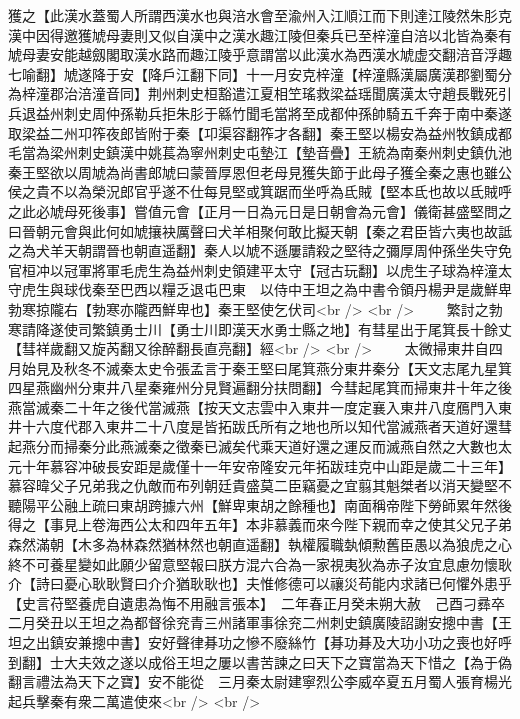獲之【此漢水蓋蜀人所謂西漢水也與涪水會至渝州入江順江而下則達江陵然朱肜克漢中因得邀獲虓母妻則又似自漢中之漢水趣江陵但秦兵已至梓潼自涪以北皆為秦有虓母妻安能越劔閣取漢水路而趣江陵乎意謂當以此漢水為西漢水虓虚交翻涪音浮趣七喻翻】虓遂降于安【降戶江翻下同】十一月安克梓潼【梓潼縣漢屬廣漢郡劉蜀分為梓潼郡治涪潼音同】荆州刺史桓豁遣江夏相笁瑤救梁益瑶聞廣漢太守趙長戰死引兵退益州刺史周仲孫勒兵拒朱肜于緜竹聞毛當將至成都仲孫帥騎五千奔于南中秦遂取梁益二州卭筰夜郎皆附于秦【卭渠容翻筰才各翻】秦王堅以楊安為益州牧鎮成都毛當為梁州刺史鎮漢中姚萇為寧州刺史屯墊江【墊音疊】王統為南秦州刺史鎮仇池秦王堅欲以周虓為尚書郎虓曰蒙晉厚恩但老母見獲失節于此母子獲全秦之惠也雖公侯之貴不以為榮況郎官乎遂不仕每見堅或箕踞而坐呼為氐賊【堅本氐也故以氐賊呼之此必虓母死後事】嘗值元會【正月一日為元日是日朝會為元會】儀衛甚盛堅問之曰晉朝元會與此何如虓攘袂厲聲曰犬羊相聚何敢比擬天朝【秦之君臣皆六夷也故詆之為犬羊天朝謂晉也朝直遥翻】秦人以虓不遜屢請殺之堅待之彌厚周仲孫坐失守免官桓冲以冠軍將軍毛虎生為益州刺史領建平太守【冠古玩翻】以虎生子球為梓潼太守虎生與球伐秦至巴西以糧乏退屯巴東　以侍中王坦之為中書令領丹楊尹是歲鮮卑勃寒掠隴右【勃寒亦隴西鮮卑也】秦王堅使乞伏司<br />
<br />
　　繁討之勃寒請降遂使司繁鎮勇士川【勇士川即漢天水勇士縣之地】有彗星出于尾箕長十餘丈【彗祥歲翻又旋芮翻又徐醉翻長直亮翻】經<br />
<br />
　　太微掃東井自四月始見及秋冬不滅秦太史令張孟言于秦王堅曰尾箕燕分東井秦分【天文志尾九星箕四星燕幽州分東井八星秦雍州分見賢遍翻分扶問翻】今彗起尾箕而掃東井十年之後燕當滅秦二十年之後代當滅燕【按天文志雲中入東井一度定襄入東井八度鴈門入東井十六度代郡入東井二十八度是皆拓跋氏所有之地也所以知代當滅燕者天道好還彗起燕分而掃秦分此燕滅秦之徵秦已滅矣代乘天道好還之運反而滅燕自然之大數也太元十年慕容冲破長安距是歲僅十一年安帝隆安元年拓跋珪克中山距是歲二十三年】慕容暐父子兄弟我之仇敵而布列朝廷貴盛莫二臣竊憂之宜翦其魁桀者以消天變堅不聽陽平公融上疏曰東胡跨據六州【鮮卑東胡之餘種也】南面稱帝陛下勞師累年然後得之【事見上卷海西公太和四年五年】本非慕義而來今陛下親而幸之使其父兄子弟森然滿朝【木多為林森然猶林然也朝直遥翻】執權履職埶傾勲舊臣愚以為狼虎之心終不可養星變如此願少留意堅報曰朕方混六合為一家視夷狄為赤子汝宜息慮勿懷耿介【詩曰憂心耿耿賢曰介介猶耿耿也】夫惟修德可以禳災苟能内求諸已何懼外患乎【史言苻堅養虎自遺患為悔不用融言張本】　二年春正月癸未朔大赦　己酉刁彞卒二月癸丑以王坦之為都督徐兖青三州諸軍事徐兖二州刺史鎮廣陵詔謝安摠中書【王坦之出鎮安兼摠中書】安好聲律朞功之慘不廢絲竹【朞功朞及大功小功之喪也好呼到翻】士大夫效之遂以成俗王坦之屢以書苦諫之曰天下之寶當為天下惜之【為于偽翻言禮法為天下之寶】安不能從　三月秦太尉建寧烈公李威卒夏五月蜀人張育楊光起兵擊秦有衆二萬遣使來<br />
<br />
